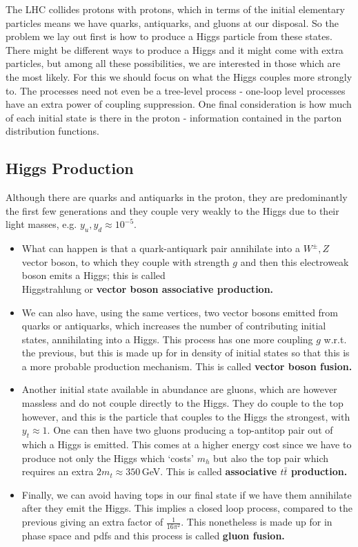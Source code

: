 \documentclass[a4paper, 11pt, normalem]{report}
\begin{document}
The LHC collides protons with protons, which in terms of the initial elementary particles means we have quarks, antiquarks, and gluons at our disposal.
So the problem we lay out first is how to produce a Higgs particle from these states.
There might be different ways to produce a Higgs and it might come with extra particles, but among all these possibilities, we are interested in those which are the most likely.
For this we should focus on what the Higgs couples more strongly to.
The processes need not even be a tree-level process - one-loop level processes have an extra power of coupling suppression.
One final consideration is how much of each initial state is there in the proton - information contained in the parton distribution functions.

\subsection{Higgs Production}
Although there are quarks and antiquarks in the proton, they are predominantly the first few generations and they couple very weakly to the Higgs due to their light masses, e.g. $y_u,y_d\approx10^{-5}$.
\begin{itemize}
    \item What can happen is that a quark-antiquark pair annihilate into a $W^\pm,Z$ vector boson, to which they couple with strength $g$ and then this electroweak boson emits a Higgs; this is called \\ Higgstrahlung or \textbf{vector boson associative production.}
    \item We can also have, using the same vertices, two vector bosons emitted from quarks or antiquarks, which increases the number of contributing initial states, annihilating into a Higgs.
        This process has one more coupling $g$ w.r.t. the previous, but this is made up for in density of initial states so that this is a more probable production mechanism.
        This is called \textbf{vector boson fusion.}
    \item Another initial state available in abundance are gluons, which are however massless and do not couple directly to the Higgs.
        They do couple to the top however, and this is the particle that couples to the Higgs the strongest, with $y_t\approx1$.
        One can then have two gluons producing a top-antitop pair out of which a Higgs is emitted.
        This comes at a higher energy cost since we have to produce not only the Higgs which `costs' $m_h$ but also the top pair which requires an extra $2m_t\approx350\,$GeV.
        This is called \textbf{associative $t\bar{t}$ production.}
    \item Finally, we can avoid having tops in our final state if we have them annihilate after they emit the Higgs.
        This implies a closed loop process, compared to the previous giving an extra factor of $\frac{1}{16\pi^2}$.
        This nonetheless is made up for in phase space and pdfs and this process is called \textbf{gluon fusion.}
\end{itemize}
\end{document}
